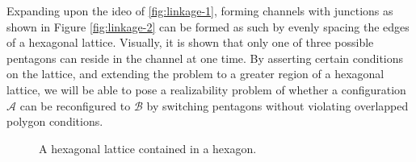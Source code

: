 Expanding upon the ideo of \ref{fig:linkage-1}, forming channels with junctions as shown in Figure \ref{fig:linkage-2} can be formed as such by evenly spacing the edges of a hexagonal lattice.  Visually, it is shown that only one of three possible pentagons can reside in the channel at one time.  By asserting certain conditions on the lattice, and extending the problem to a greater region of a hexagonal lattice, we will be able to pose a realizability problem of whether a configuration $\mathcal{A}$ can be reconfigured to $\mathcal{B}$ by switching pentagons without violating overlapped polygon conditions.
\newdimen\R
\R=3cm
\begin{figure}[h] 
\begin{center}
\caption{A hexagonal lattice contained in a hexagon.}
\label{fig:lattice}
\end{center}
\end{figure}
\newpage

